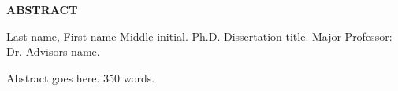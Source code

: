 \documentclass[letterpaper,12pt]{report}
\begin{document}
\doublespacing

\clearpage


\clearpage

\begin{center}
\MakeUppercase{\textbf{Abstract}}
\end{center}


\singlespacing
\normalsize
Last name, First name Middle initial. Ph.D. Dissertation title. Major Professor: Dr. Advisors name.\\
\doublespacing
\normalsize

Abstract goes here. 350 words.

\clearpage

\singlespacing


\renewcommand{\cftdotsep}{1.5}
\setcounter{secnumdepth}{3}
\setcounter{tocdepth}{3}

\renewcommand\contentsname{TABLE OF CONTENTS}
\setlength{\cftbeforetoctitleskip}{-12pt}
\setlength{\cftaftertoctitleskip}{24pt}
\renewcommand{\cfttoctitlefont}{\hfill\textbf}
\renewcommand{\cftaftertoctitle}{\hfill\hfill}
\setlength{\cftbeforechapskip}{12pt}
\setlength{\cftbeforesecskip}{0pt}
\renewcommand{\cftchapfont}{}
\renewcommand{\cftchappagefont}{}
\renewcommand*\cftchapdotsep{\cftnodots}
\renewcommand*\cftsecdotsep{\cftnodots}
\renewcommand*\cftsubsecdotsep{\cftnodots}
\renewcommand*\cftsubsubsecdotsep{\cftnodots}

\renewcommand\listtablename{LIST OF TABLES}
\setlength{\cftbeforelottitleskip}{-12pt}
\setlength{\cftafterlottitleskip}{24pt}
\renewcommand{\cftlottitlefont}{\hfill\textbf}
\renewcommand{\cftafterlottitle}{\hfill}
\setlength{\cftbeforetabskip}{12pt}
\renewcommand*\cfttabdotsep{\cftnodots}

\renewcommand\listfigurename{LIST OF FIGURES}
\setlength{\cftbeforeloftitleskip}{-12pt}
\setlength{\cftafterloftitleskip}{24pt}
\renewcommand{\cftloftitlefont}{\hfill\textbf}
\renewcommand{\cftafterloftitle}{\hfill}
\setlength{\cftbeforefigskip}{12pt}
\renewcommand*\cftfigdotsep{\cftnodots}

\tableofcontents

\clearpage

\end{document}
